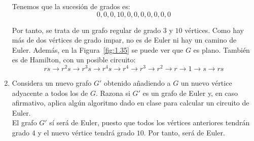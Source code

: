 \begin{ejercicio}
\begin{enumerate}
        Tenemos que la sucesión de grados es:
        \begin{equation*}
            0, 0, 0, 10, 0, 0, 0, 0, 0, 0, 0
        \end{equation*}

        Por tanto, se trata de un grafo regular de grado $3$ y $10$ vértices. Como hay más de dos vértices de grado impar, no es de Euler ni hay un camino de Euler. Además, en la Figura~\ref{fig:1.35} se puede ver que $G$ es plano. También es de Hamilton, con un posible circuito:
        \begin{equation*}
            rs\to r^2s\to r^3s\to r^4s\to r^4\to r^3\to r^2\to r\to 1\to s\to rs
        \end{equation*}
        \item Considera un nuevo grafo $G'$ obtenido añadiendo a $G$ un nuevo vértice adyacente a todos los de $G$. Razona si $G'$ es un grafo de Euler y, en caso afirmativo, aplica algún algoritmo dado en clase para calcular un circuito de Euler.\\
        
        El grafo $G'$ sí será de Euler, puesto que todos los vértices anteriores tendrán grado $4$ y el nuevo vértice tendrá grado $10$. Por tanto, será de Euler.
    \end{enumerate}
\end{ejercicio}

